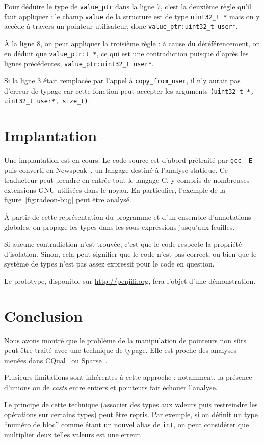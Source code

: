 Pour déduire le type de \texttt{value\_ptr} dans la ligne 7, c'est la
deuxième règle qu'il faut appliquer : le champ \texttt{value} de
la structure est de type \texttt{uint32\_t~*} mais on y accède à travers
un pointeur utilisateur, donc \texttt{value\_ptr:uint32\_t user*}.

À la ligne 8, on peut appliquer la troisième règle : à cause du déréférencement,
on en déduit que \texttt{value\_ptr:t *}, ce qui est une contradiction puisque
d'après les lignes précédentes, \texttt{value\_ptr:uint32\_t user*}.

Si la ligne 3 était remplacée par l'appel à \texttt{copy\_from\_user}, il n'y
aurait pas d'erreur de typage car cette fonction peut accepter les arguments
\texttt{(uint32\_t~*, uint32\_t user*, size\_t)}.

\section{Implantation}

Une implantation est en cours. Le code source est d'abord prétraité par
\texttt{gcc -E} puis converti en Newspeak~\cite{newspeak}, un langage destiné à
l'analyse statique. Ce traducteur peut prendre en entrée tout le langage C, y
compris de nombreuses extensions GNU utilisées dans le noyau. En particulier,
l'exemple de la figure~\ref{fig:radeon-bug} peut être analysé.

À partir de cette représentation du programme et d'un ensemble d'annotations
globales, on propage les types dans les sous-expressions jusqu'aux feuilles.

Si aucune contradiction n'est trouvée, c'est que le code respecte la propriété
d'isolation. Sinon, cela peut signifier que le code n'est pas correct, ou bien
que le système de types n'est pas assez expressif pour le code en question.

Le prototype, disponible sur \url{http://penjili.org}, fera l'objet d'une
démonstration.

\section{Conclusion}


Nous avons montré que le problème de la manipulation de pointeurs non sûrs peut
être traité avec une technique de typage. Elle est proche des analyses menées
dans CQual~\cite{pldi99} ou Sparse~\cite{TorvaldsSparse}.


Plusieurs limitations sont inhérentes à cette approche : notamment, la présence
d'unions ou de \emph{casts} entre entiers et pointeurs fait échouer l'analyse.


Le principe de cette technique (associer des types aux valeurs puis restreindre
les opérations sur certains types) peut être repris. Par exemple, si on définit
un type ``numéro de bloc'' comme étant un nouvel alias de \texttt{int}, on peut
considérer que multiplier deux telles valeurs est une erreur.
